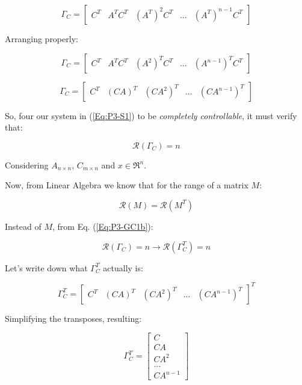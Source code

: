 \documentclass[10pt,a4paper]{article}
\begin{document}
\[ \Gamma_{C} = 
\begin{bmatrix}
C^{T} & A^{T}C^{T} & (A^{T})^{2}C^{T} & ... & (A^{T})^{n-1}C^{T} 
\end{bmatrix}
\]

Arranging properly:

\[ \Gamma_{C} = 
\begin{bmatrix}
C^{T} & A^{T}C^{T} & (A^{2})^{T}C^{T} & ... & (A^{n-1})^{T}C^{T} 
\end{bmatrix}
\]

\begin{equation} 
\Gamma_{C} = 
\begin{bmatrix}
C^{T} & (CA)^{T} & (CA^{2})^{T} & ... & (CA^{n-1})^{T} 
\end{bmatrix}
\label{Eq:P3-GC1a}
\end{equation}

So, four our system in (\ref{Eq:P3-S1}) to be \textit{completely controllable}, it must verify that:

\begin{equation} \mathcal{R} (\Gamma_{C}) = n
\label{Eq:P3-GC1b} 
\end{equation}

Considering $A_{n\times n}$, $C_{m \times n}$ and $x \in \Re^{n} $.
\medskip

Now, from Linear Algebra we know that for the range of a matrix $M$:

\[ \mathcal{R}(M) =  \mathcal{R}(M^{T}) \]

Instead of $M$, from Eq. (\ref{Eq:P3-GC1b}):

\begin{equation} 
\mathcal{R} (\Gamma_{C}) = n \rightarrow  \mathcal{R} (\Gamma^{T}_{C}) = n 
\label{Eq3:-EqGrammians}
\end{equation}

Let's write down what  $\Gamma^{T}_{C}$ actually is:

\[
\Gamma^{T}_{C} = 
\begin{bmatrix}
C^{T} & (CA)^{T} & (CA^{2})^{T} & ... & (CA^{n-1})^{T} 
\end{bmatrix}^{T}
\]

Simplifying the transposes, resulting:

\begin{equation}
\Gamma^{T}_{C} = 
\begin{bmatrix}
C \\
CA \\
CA^{2} \\
 ... \\
CA^{n-1} 
\end{bmatrix}
\label{Eq:P3-GT-Cc}
\end{equation}
\end{document}
